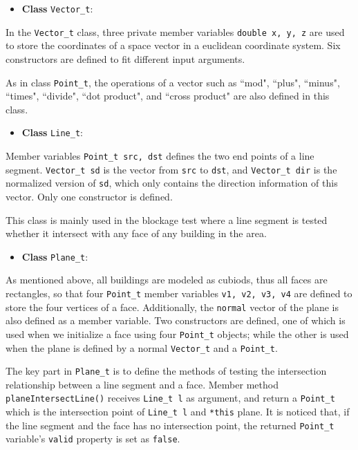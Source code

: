 \documentclass[paper=a4, fontsize=11pt]{scrartcl}
\numberwithin{equation}{section}		%
\numberwithin{figure}{section}			%
\numberwithin{table}{section}				%
\begin{document}
\begin{itemize}
	\item \textbf{Class} \verb|Vector_t|:
\end{itemize}

In the \verb|Vector_t| class, three private member variables \verb|double x, y, z| are used to store the coordinates of a space vector in a euclidean coordinate system. Six constructors are defined to fit different input arguments.

As in class \verb|Point_t|, the operations of a vector such as ``mod", ``plus", ``minus", ``times", ``divide", ``dot product", and ``cross product" are also defined in this class.

\begin{itemize}
	\item \textbf{Class} \verb|Line_t|:
\end{itemize}

Member variables \verb|Point_t src, dst| defines the two end points of a line segment. \verb|Vector_t sd| is the vector from \verb|src| to \verb|dst|, and \verb|Vector_t dir| is the normalized version of \verb|sd|, which only contains the direction information of this vector. Only one constructor is defined. 

This class is mainly used in the blockage test where a line segment is tested whether it intersect with any face of any building in the area. 

\begin{itemize}
	\item \textbf{Class} \verb|Plane_t|:
\end{itemize}

As mentioned above, all buildings are modeled as cubiods, thus all faces are rectangles, so that four \verb|Point_t| member variables \verb|v1, v2, v3, v4| are defined to store the four vertices of a face. Additionally, the \verb|normal| vector of the plane is also defined as a member variable. Two constructors are defined, one of which is used when we initialize a face using four \verb|Point_t| objects; while the other is used when the plane is defined by a normal \verb|Vector_t| and a \verb|Point_t|.

The key part in \verb|Plane_t| is to define the methods of testing the intersection relationship between a line segment and a face. Member method \verb|planeIntersectLine()| receives \verb|Line_t l| as argument, and return a \verb|Point_t| which is the intersection point of \verb|Line_t l| and \verb|*this| plane. It is noticed that, if the line segment and the face has no intersection point, the returned \verb|Point_t| variable's \verb|valid| property is set as \verb|false|. 
\end{document}
